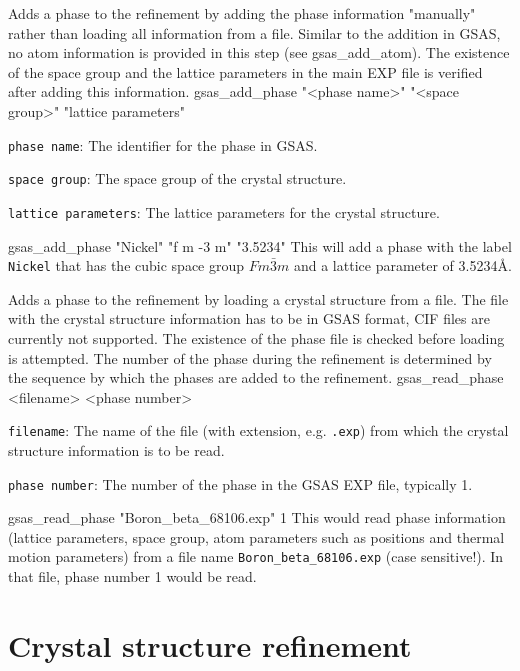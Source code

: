 {
Adds a phase to the refinement by adding the phase information "manually" rather than loading all information from a file. Similar to the addition in GSAS, no atom information is provided in this step (see gsas\_add\_atom). The existence of the space group and the lattice parameters in the main EXP file is verified after adding this information.
}{
gsas\_add\_phase "<phase name>" "<space group>" "lattice parameters"
}{
\item \texttt{phase name}: The identifier for the phase in GSAS.
\item \texttt{space group}: The space group of the crystal structure.
\item \texttt{lattice parameters}: The lattice parameters for the crystal structure.
}{
gsas\_add\_phase "Nickel" "f m -3 m" "3.5234"
}{
This will add a phase with the label \texttt{Nickel} that has the cubic space group $Fm\bar{3}m$ and a lattice parameter of 3.5234\AA.
}

{
Adds a phase to the refinement by loading a crystal structure from a file. The file with the crystal structure information has to be in GSAS format, CIF files are currently not supported. The existence of the phase file is checked before loading is attempted. The number of the phase during the refinement is determined by the sequence by which the phases are added to the refinement.
}{
gsas\_read\_phase <filename> <phase number>
}{
\item \texttt{filename}: The name of the file (with extension, e.g. \texttt{.exp}) from which the crystal structure information is to be read.
\item \texttt{phase number}: The number of the phase in the GSAS EXP file, typically 1.
}{
gsas\_read\_phase "Boron\_beta\_68106.exp" 1
}{
This would read phase information (lattice parameters, space group, atom parameters such as positions and thermal motion parameters) from a file name \texttt{Boron\_beta\_68106.exp} (case sensitive!). In that file, phase number 1 would be read.
}

\section{Crystal structure refinement}

